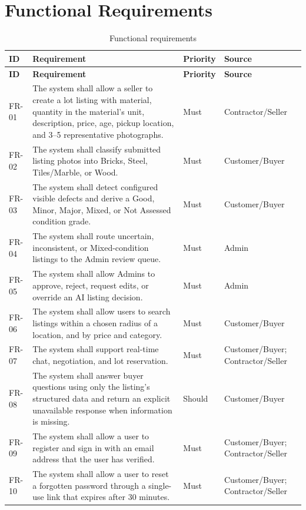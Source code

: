 \section{Functional Requirements }
{\footnotesize
\begin{longtable}{@{}p{}p{}p{}p{}@{}}
\caption{Functional requirements}\label{tab:functional-requirements}\\
\toprule
\textbf{ID} & \textbf{Requirement} & \textbf{Priority} & \textbf{Source} \\
\midrule
\endfirsthead
\toprule
\textbf{ID} & \textbf{Requirement} & \textbf{Priority} & \textbf{Source} \\
\midrule
\endhead
FR-01 & The system shall allow a seller to create a lot listing with material, quantity in the material's unit, description, price, age, pickup location, and 3--5 representative photographs. & Must & Contractor/Seller \\
FR-02 & The system shall classify submitted listing photos into Bricks, Steel, Tiles/Marble, or Wood. & Must & Customer/Buyer \\
FR-03 & The system shall detect configured visible defects and derive a Good, Minor, Major, Mixed, or Not Assessed condition grade. & Must & Customer/Buyer \\
FR-04 & The system shall route uncertain, inconsistent, or Mixed-condition listings to the Admin review queue. & Must & Admin \\
FR-05 & The system shall allow Admins to approve, reject, request edits, or override an AI listing decision. & Must & Admin \\
FR-06 & The system shall allow users to search listings within a chosen radius of a location, and by price and category. & Must & Customer/Buyer \\
FR-07 & The system shall support real-time chat, negotiation, and lot reservation. & Must & Customer/Buyer; Contractor/Seller \\
FR-08 & The system shall answer buyer questions using only the listing's structured data and return an explicit unavailable response when information is missing. & Should & Customer/Buyer \\
FR-09 & The system shall allow a user to register and sign in with an email address that the user has verified. & Must & Customer/Buyer; Contractor/Seller \\
FR-10 & The system shall allow a user to reset a forgotten password through a single-use link that expires after 30 minutes. & Must & Customer/Buyer; Contractor/Seller \\

\end{longtable}}
